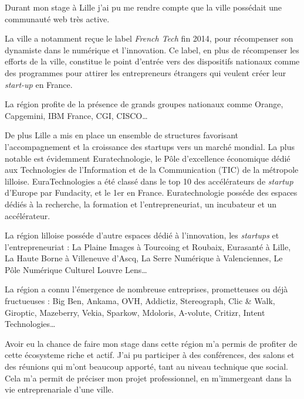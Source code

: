 \documentclass[12pt,a4paper]{article}
\begin{document}
  Durant mon stage à Lille j'ai pu me rendre compte que la ville possédait
  une communauté web très active.

  \bigskip

  La ville a notamment reçue le label \emph{French Tech} fin 2014, pour
  récompenser son dynamiste dans le numérique et l'innovation. Ce label,
  en plus de récompenser les efforts de la ville, constitue le point
  d'entrée vers des dispositifs nationaux comme des programmes pour
  attirer les entrepreneurs étrangers qui veulent créer leur
  \emph{start-up} en France.

  \bigskip

  La région profite de la présence de grands groupes nationaux comme
  Orange, Capgemini, IBM France, CGI, CISCO\ldots{}

  \bigskip

  De plus Lille a mis en place un ensemble de structures favorisant
  l'accompagnement et la croissance des startups vers un marché mondial.
  La plus notable est évidemment Euratechnologie, le Pôle d'excellence
  économique dédié aux Technologies de l'Information et de la
  Communication (TIC) de la métropole lilloise. EuraTechnologies a été
  classé dans le top 10 des accélérateurs de \emph{startup} d'Europe par
  Fundacity, et le 1er en France. Euratechnologie posséde des espaces
  dédiés à la recherche, la formation et l'entrepreneuriat, un incubateur
  et un accélérateur.

  \bigskip

  La région lilloise posséde d'autre espaces dédié à l'innovation, les
  \emph{startups} et l'entrepreneuriat : La Plaine Images à Tourcoing et
  Roubaix, Eurasanté à Lille, La Haute Borne à Villeneuve d'Ascq, La Serre
  Numérique à Valenciennes, Le Pôle Numérique Culturel Louvre Lens\ldots{}

  \bigskip

  La région a connu l'émergence de nombreuse entreprises, prometteuses ou
  déjà fructueuses : Big Ben, Ankama, OVH, Addictiz, Stereograph, Clic \&
  Walk, Giroptic, Mazeberry, Vekia, Sparkow, Mdoloris, A-volute, Critizr,
  Intent Technologies\ldots{}

  \bigskip

  Avoir eu la chance de faire mon stage dans cette région m'a permis de
  profiter de cette écosysteme riche et actif. J'ai pu participer à des
  conférences, des salons et des réunions qui m'ont beaucoup apporté, tant
  au niveau technique que social. Cela m'a permit de préciser mon projet
  professionnel, en m'immergeant dans la vie entreprenariale d'une ville.
\end{document}

